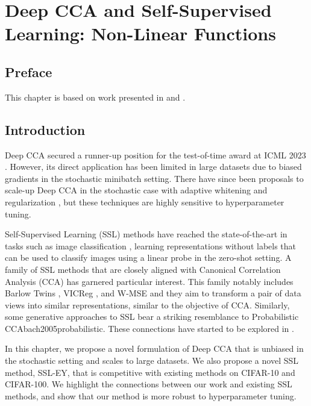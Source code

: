 \graphicspath{{chapters/deep_learning/}}

\chapter{Deep CCA and Self-Supervised Learning: Non-Linear Functions}\label{ch:deep_learning}
\minitoc
\section*{Preface}

This chapter is based on work presented in \citet{chapman2023cca} and \citet{chapman2023efficient}.

\section{Introduction}

Deep CCA \citep{andrew2013deep} secured a runner-up position for the test-of-time award at ICML 2023 \citep{ICML2023TOT}.
However, its direct application has been limited in large datasets due to biased gradients in the stochastic minibatch setting.
There have since been proposals to scale-up Deep CCA in the stochastic case with adaptive whitening \citep{wang2015stochastic} and regularization \citep{chang2018scalable}, but these techniques are highly sensitive to hyperparameter tuning.

Self-Supervised Learning (SSL) methods have reached the state-of-the-art in tasks such as image classification \citep{balestriero2023cookbook}, learning representations without labels that can be used to classify images using a linear probe in the zero-shot setting.
A family of SSL methods that are closely aligned with Canonical Correlation Analysis (CCA) has garnered particular interest.
This family notably includes Barlow Twins \citep{zbontar2021barlow}, VICReg \citep{bardes2021vicreg}, and W-MSE \citep{ermolov2021whitening} and they aim to transform a pair of data views into similar representations, similar to the objective of CCA. Similarly, some generative approaches to SSL\citep{sansone2022gedi} bear a striking resemblance to Probabilistic CCA\citealp*[postnote]{bibid}{bach2005probabilistic}.
These connections have started to be explored in \citet{balestriero2022contrastive}.

In this chapter, we propose a novel formulation of Deep CCA that is unbiased in the stochastic setting and scales to large datasets.
We also propose a novel SSL method, SSL-EY, that is competitive with existing methods on CIFAR-10 and CIFAR-100.
We highlight the connections between our work and existing SSL methods, and show that our method is more robust to hyperparameter tuning.

